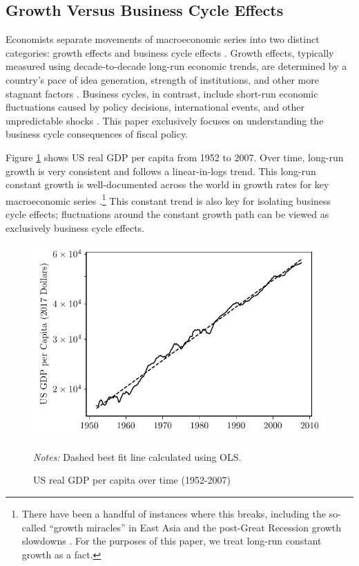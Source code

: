 \subsection{Growth Versus Business Cycle Effects} \label{subsec:detrend}

Economists separate movements of macroeconomic series into two distinct categories: growth effects and business cycle effects \parencite{stulz1985macroeconomic}. Growth effects, typically measured using decade-to-decade long-run economic trends, are determined by a country's pace of idea generation, strength of institutions, and other more stagnant factors \parencites{acemoglu2001colonial}{jones2016facts}{jones2019paul}. Business cycles, in contrast, include short-run economic fluctuations caused by policy decisions, international events, and other unpredictable shocks \parencites{lucas1995understanding}{mitchell2024business}. This paper exclusively focuses on understanding the business cycle consequences of fiscal policy.

Figure \ref{fig:growth-effects} shows US real GDP per capita from 1952 to 2007. Over time, long-run growth is very consistent and follows a linear-in-logs trend. This long-run constant growth is well-documented across the world in growth rates for key macroeconomic series \parencites{papell2014long}.\footnote{There have been a handful of instances where this breaks, including the so-called ``growth miracles'' in East Asia \parencite{easterly199511} and the post-Great Recession growth slowdowns \parencites{benigno2018stagnation}. For the purposes of this paper, we treat long-run constant growth as a fact.} This constant trend is also key for isolating business cycle effects; fluctuations around the constant growth path can be viewed as exclusively business cycle effects.

\begin{figure}[t]
    \centering
    \caption{US real GDP per capita over time (1952-2007)}
    \includegraphics{figures/growth_effects.pdf}

    {\scriptsize \emph{Notes:} Dashed best fit line calculated using OLS.}
    \label{fig:growth-effects}
\end{figure}


